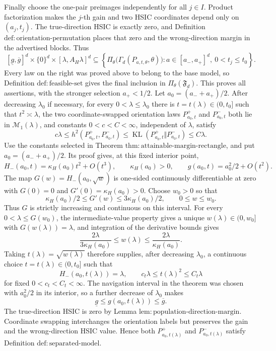 Finally choose the one-pair preimages independently for all \(j\in I\).  Product factorization makes the \(j\)-th gain and two HSIC coordinates depend only on \((a_j,t_j)\).  The true-direction HSIC is exactly zero, and Definition \(\mathrm{def:orientation\text{-}permutation}\) places that zero and the wrong-direction margin in the advertised blocks.  Thus
\[
[\underline g,\overline g]^d\times\{0\}^d\times[\lambda,A_H\lambda]^d
\subseteq
\left\{\Pi_\theta\bigl(\Gamma_d(P_{a,t,\theta},\theta)\bigr):
a\in[a_-,a_+]^d,\ 0<t_j\le t_0\right\}.
\]
Every law on the right was proved above to belong to the base model, so Definition \(\mathrm{def:feasible\text{-}set}\) gives the final inclusion in \(\Pi_\theta(\mathfrak F_d)\).  This proves all assertions, with the stronger selection \(a_+<1/2\).
Let \(a_0=(a_-+a_+)/2\).  After decreasing \(\lambda_0\) if necessary, for every \(0<\lambda\le\lambda_0\) there is \(t=t(\lambda)\in(0,t_0]\) such that \(t^2\asymp\lambda\), the two coordinate-swapped orientation laws \(P^+_{a_0,t}\) and \(P^-_{a_0,t}\) both lie in \(\mathcal M_1(\lambda)\), and constants \(0<c<C<\infty\), independent of \(\lambda\), satisfy
\[
c\lambda\le h^2(P^+_{a_0,t},P^-_{a_0,t})\le
\operatorname{KL}(P^+_{a_0,t}\Vert P^-_{a_0,t})\le C\lambda.
\]
Use the constants selected in Theorem \(\mathrm{thm:attainable\text{-}margin\text{-}rectangle}\), and put \(a_0=(a_-+a_+)/2\).  Its proof gives, at this fixed interior point,
\[
H_-(a_0,t)=\kappa_H(a_0)t^2+O(t^3),\qquad \kappa_H(a_0)>0,\qquad
g(a_0,t)=a_0^2/2+O(t^2).
\]
The map \(G(w)=H_-(a_0,\sqrt w)\) is one-sided continuously differentiable at zero with \(G(0)=0\) and \(G'(0)=\kappa_H(a_0)>0\).  Choose \(w_0>0\) so that
\[
\kappa_H(a_0)/2\le G'(w)\le3\kappa_H(a_0)/2,\qquad 0\le w\le w_0.
\]
Thus \(G\) is strictly increasing and continuous on this interval.  For every \(0<\lambda\le G(w_0)\), the intermediate-value property gives a unique \(w(\lambda)\in(0,w_0]\) with \(G(w(\lambda))=\lambda\), and integration of the derivative bounds gives
\[
\frac{2\lambda}{3\kappa_H(a_0)}\le w(\lambda)\le
\frac{2\lambda}{\kappa_H(a_0)}.
\]
Taking \(t(\lambda)=\sqrt{w(\lambda)}\) therefore supplies, after decreasing \(\lambda_0\), a continuous choice \(t=t(\lambda)\in(0,t_0]\) such that
\[
H_-(a_0,t(\lambda))=\lambda,\qquad
c_t\lambda\le t(\lambda)^2\le C_t\lambda
\]
for fixed \(0<c_t<C_t<\infty\).  The navigation interval in the theorem was chosen with \(a_0^2/2\) in its interior, so a further decrease of \(\lambda_0\) makes
\[
\underline g\le g(a_0,t(\lambda))\le\overline g.
\]
The true-direction HSIC is zero by Lemma \(\mathrm{lem:population\text{-}direction\text{-}margin}\).  Coordinate swapping interchanges the orientation labels but preserves the gain and the wrong-direction HSIC value.  Hence both \(P^+_{a_0,t(\lambda)}\) and \(P^-_{a_0,t(\lambda)}\) satisfy Definition \(\mathrm{def:separated\text{-}model}\).

